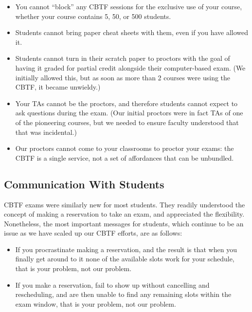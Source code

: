 \begin{itemize}

\item You cannot ``block'' any  CBTF sessions for the exclusive use of
  your course, whether your course contains 5, 50, or 500 students.

\item Students cannot bring paper cheat sheets with them, even if you
  have allowed it.

\item Students cannot turn in their scratch paper to proctors with the
  goal of having it graded for partial credit alongside their
  computer-based exam.  (We initially allowed this, but as soon as
  more than 2 courses were using the CBTF, it became unwieldy.)

\item Your TAs cannot be the proctors, and therefore students cannot
  expect to ask questions during the exam.  (Our initial proctors were in
  fact TAs of one of the pioneering courses, but we needed to ensure
  faculty understood that that was incidental.)

\item Our proctors cannot come to your classrooms to proctor your
  exams: the CBTF is a single service, not a set of affordances that
  can be unbundled. 

\end{itemize}

\subsection{Communication With Students}


CBTF exams were similarly new for most students.  They readily
understood the concept of making a reservation to take an exam, and
appreciated the flexibility.  Nonetheless,
the most important
messages for students, which continue to be an issue as we have scaled
up our CBTF efforts, are as follows:

\begin{itemize}

\item If you procrastinate making a reservation, and the result is
  that when you finally get around to it none of the available slots
  work for your schedule, that is your problem, not our problem.

\item If you make a reservation, fail to show up without cancelling
  and rescheduling, and are then unable to find any remaining slots
  within the exam window, that is your problem, not our problem.

\end{itemize}

